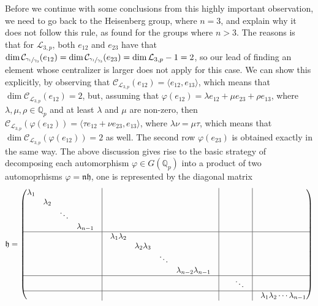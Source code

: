 \documentclass[12pt]{article}
\begin{document}
Before we continue with some conclusions from this highly important observation, we need to go back to the Heisenberg group, where $n=3$, and explain why it does not follow this rule, as found for the groups where $n>3$. The reasons is that for $\mathcal{L}_{3,p}$, both $e_{12}$ and $e_{23}$ have that $\dim\mathcal{C}_{\sfrac{\gamma_1}{\gamma_3}}(e_{12})=\dim\mathcal{C}_{\sfrac{\gamma_1}{\gamma_3}}(e_{23})=\dim\mathcal{L}_{3,p}-1=2$, so our lead of finding an element whose centralizer is larger does not apply for this case. We can show this explicitly, by observing that $\mathcal{C}_{\mathcal{L}_{3,p}}(e_12)=\langle e_{12},e_{13}\rangle$, which means that $\dim\mathcal{C}_{\mathcal{L}_{3,p}}(e_12)=2$, but, assuming that $\varphi(e_12)=\lambda e_{12}+\mu e_{23}+\rho e_{13}$, where $\lambda,\mu,\rho\in\mathbb{Q}_p$ and at least $\lambda$ and $\mu$ are non-zero, then $\mathcal{C}_{\mathcal{L}_{3,p}}(\varphi(e_{12}))=\langle \tau e_{12}+\nu e_{23},e_{13} \rangle$, where $\lambda\nu=\mu\tau$, which means that $\dim\mathcal{C}_{\mathcal{L}_{3,p}}(\varphi(e_{12}))=2$ as well. The second row $\varphi(e_{23})$ is obtained exactly in the same way.
The above discussion gives rise to the basic strategy of decomposing each automorphism $\varphi\in G(\mathbb{Q}_p)$ into a product of two automoprhisms $\varphi=\mathfrak{nh}$, one is represented by the diagonal matrix\[\mathfrak{h}=\begin{pmatrix}
\begin{matrix}\lambda_1 & & &\\
& \lambda_2 & &\\
& & \ddots &\\
& & & \lambda_{n-1}\\
\end{matrix} & \vline & &\vline &  &  & \vline&\\
\hline
 & \vline & \begin{matrix}\lambda_1\lambda_2 & & &\\
& \lambda_2\lambda_3 & &\\
& & \ddots &\\
& & & \lambda_{n-2}\lambda_{n-1}\\
\end{matrix}&\vline &  & &\vline& \\
\hline
 & \vline & &\vline &  & \ddots &\vline& \\
\hline
 & \vline &  &\vline &  &  &\vline& \lambda_1\lambda_2\cdots\lambda_{n-1}\\
\end{pmatrix}
\]
\end{document}
